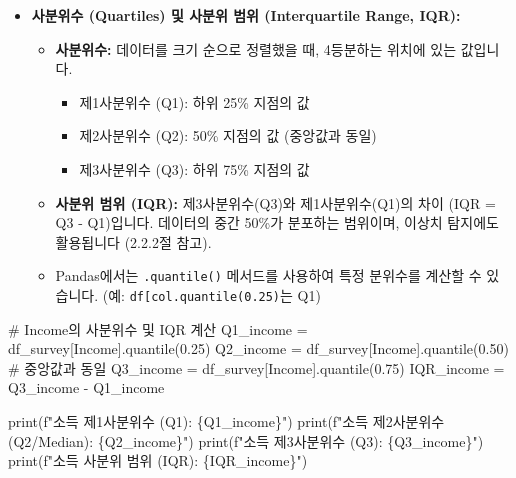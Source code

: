 \documentclass[
  letterpaper,
]{book}
\newenvironment{Shaded}{\begin{snugshade}}{\end{snugshade}}
\newcommand{\BuiltInTok}[1]{\textcolor[rgb]{0.00,0.23,0.31}{#1}}
\newcommand{\CommentTok}[1]{\textcolor[rgb]{0.37,0.37,0.37}{#1}}
\newcommand{\FloatTok}[1]{\textcolor[rgb]{0.68,0.00,0.00}{#1}}
\newcommand{\NormalTok}[1]{\textcolor[rgb]{0.00,0.23,0.31}{#1}}
\newcommand{\OperatorTok}[1]{\textcolor[rgb]{0.37,0.37,0.37}{#1}}
\newcommand{\SpecialCharTok}[1]{\textcolor[rgb]{0.37,0.37,0.37}{#1}}
\newcommand{\SpecialStringTok}[1]{\textcolor[rgb]{0.13,0.47,0.30}{#1}}
\newcommand{\StringTok}[1]{\textcolor[rgb]{0.13,0.47,0.30}{#1}}
\providecommand{\tightlist}{%
  \setlength{\itemsep}{0pt}\setlength{\parskip}{0pt}}
\begin{document}
\begin{itemize}
\tightlist
\item
  \textbf{사분위수 (Quartiles) 및 사분위 범위 (Interquartile Range,
  IQR):}

  \begin{itemize}
  \tightlist
  \item
    \textbf{사분위수:} 데이터를 크기 순으로 정렬했을 때, 4등분하는
    위치에 있는 값입니다.

    \begin{itemize}
    \tightlist
    \item
      제1사분위수 (Q1): 하위 25\% 지점의 값
    \item
      제2사분위수 (Q2): 50\% 지점의 값 (중앙값과 동일)
    \item
      제3사분위수 (Q3): 하위 75\% 지점의 값
    \end{itemize}
  \item
    \textbf{사분위 범위 (IQR):} 제3사분위수(Q3)와 제1사분위수(Q1)의 차이
    (IQR = Q3 - Q1)입니다. 데이터의 중간 50\%가 분포하는 범위이며,
    이상치 탐지에도 활용됩니다 (2.2.2절 참고).
  \item
    Pandas에서는 \texttt{.quantile()} 메서드를 사용하여 특정 분위수를
    계산할 수 있습니다. (예:
    \texttt{df{[}\textquotesingle{}col\textquotesingle{}{]}.quantile(0.25)}는
    Q1)
  \end{itemize}
\end{itemize}

\begin{Shaded}
\begin{Highlighting}[]
    \CommentTok{\# Income의 사분위수 및 IQR 계산}
\NormalTok{    Q1\_income }\OperatorTok{=}\NormalTok{ df\_survey[}\StringTok{\textquotesingle{}Income\textquotesingle{}}\NormalTok{].quantile(}\FloatTok{0.25}\NormalTok{)}
\NormalTok{    Q2\_income }\OperatorTok{=}\NormalTok{ df\_survey[}\StringTok{\textquotesingle{}Income\textquotesingle{}}\NormalTok{].quantile(}\FloatTok{0.50}\NormalTok{) }\CommentTok{\# 중앙값과 동일}
\NormalTok{    Q3\_income }\OperatorTok{=}\NormalTok{ df\_survey[}\StringTok{\textquotesingle{}Income\textquotesingle{}}\NormalTok{].quantile(}\FloatTok{0.75}\NormalTok{)}
\NormalTok{    IQR\_income }\OperatorTok{=}\NormalTok{ Q3\_income }\OperatorTok{{-}}\NormalTok{ Q1\_income}

    \BuiltInTok{print}\NormalTok{(}\SpecialStringTok{f"소득 제1사분위수 (Q1): }\SpecialCharTok{\{}\NormalTok{Q1\_income}\SpecialCharTok{\}}\SpecialStringTok{"}\NormalTok{)}
    \BuiltInTok{print}\NormalTok{(}\SpecialStringTok{f"소득 제2사분위수 (Q2/Median): }\SpecialCharTok{\{}\NormalTok{Q2\_income}\SpecialCharTok{\}}\SpecialStringTok{"}\NormalTok{)}
    \BuiltInTok{print}\NormalTok{(}\SpecialStringTok{f"소득 제3사분위수 (Q3): }\SpecialCharTok{\{}\NormalTok{Q3\_income}\SpecialCharTok{\}}\SpecialStringTok{"}\NormalTok{)}
    \BuiltInTok{print}\NormalTok{(}\SpecialStringTok{f"소득 사분위 범위 (IQR): }\SpecialCharTok{\{}\NormalTok{IQR\_income}\SpecialCharTok{\}}\SpecialStringTok{"}\NormalTok{)}
\end{Highlighting}
\end{Shaded}
\end{document}
